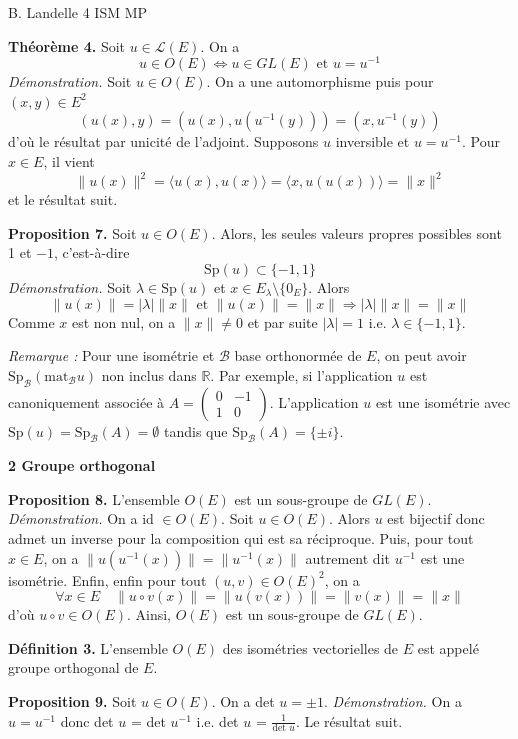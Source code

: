 B. Landelle
\hfill 4
\hfill ISM MP

\textbf{Théorème 4.} Soit $u \in \mathcal{L}(E)$. On a
\[
u \in O(E) \Leftrightarrow u \in GL(E) \text{ et } u = u^{-1}
\]
\textit{Démonstration.} Soit $u \in O(E)$. On a une automorphisme puis pour $(x,y) \in E^2$
\[
(u(x),y) = (u(x), u(u^{-1}(y))) = (x, u^{-1}(y))
\]
d'où le résultat par unicité de l'adjoint. Supposons $u$ inversible et $u = u^{-1}$. Pour $x \in E$, il vient
\[
\|u(x)\|^2 = \langle u(x), u(x) \rangle = \langle x, u(u(x)) \rangle = \|x\|^2
\]
et le résultat suit.

\textbf{Proposition 7.} Soit $u \in O(E)$. Alors, les seules valeurs propres possibles sont 1 et $-1$, c'est-à-dire
\[
\text{Sp}(u) \subset \{-1, 1\}
\]
\textit{Démonstration.} Soit $\lambda \in \text{Sp}(u)$ et $x \in E_ \lambda \setminus \{0_E\}$. Alors
\[
\|u(x)\| = |\lambda| \|x\| \text{ et } \|u(x)\| = \|x\| \Rightarrow |\lambda| \|x\| = \|x\|
\]
Comme $x$ est non nul, on a $\|x\| \neq 0$ et par suite $|\lambda| = 1$ i.e. $\lambda \in \{-1, 1\}$.

\textit{Remarque :} Pour une isométrie et $\mathcal{B}$ base orthonormée de $E$, on peut avoir $\text{Sp}_ \mathcal{B} (\text{mat}_{ \mathcal{B} } u)$ non inclus dans $\mathbb{R}$. Par exemple, si l'application $u$ est canoniquement associée à $A = \begin{pmatrix} 0 & -1 \\ 1 & 0 \end{pmatrix}$.
L'application $u$ est une isométrie avec $\text{Sp}(u) = \text{Sp}_ \mathcal{B} (A) = \emptyset$ tandis que $\text{Sp}_ \mathcal{B} (A) = \{ \pm i \}$.

\textbf{2 Groupe orthogonal}

\textbf{Proposition 8.} L'ensemble $O(E)$ est un sous-groupe de $GL(E)$.
\textit{Démonstration.} On a id $\in O(E)$. Soit $u \in O(E)$. Alors $u$ est bijectif donc admet un inverse pour la composition qui est sa réciproque. Puis, pour tout $x \in E$, on a $\|u(u^{-1}(x))\| = \|u^{-1}(x)\|$ autrement dit $u^{-1}$ est une isométrie. Enfin, enfin pour tout $(u,v) \in O(E)^2$, on a
\[
\forall x \in E \quad \|u \circ v(x)\| = \|u(v(x))\| = \|v(x)\| = \|x\|
\]
d'où $u \circ v \in O(E)$. Ainsi, $O(E)$ est un sous-groupe de $GL(E)$.

\textbf{Définition 3.} L'ensemble $O(E)$ des isométries vectorielles de $E$ est appelé groupe orthogonal de $E$.

\textbf{Proposition 9.} Soit $u \in O(E)$. On a det $u = \pm 1$.
\textit{Démonstration.} On a $u = u^{-1}$ donc det $u$ = det $u^{-1}$ i.e. det $u$ = $\frac{1}{\text{det } u}$. Le résultat suit.

